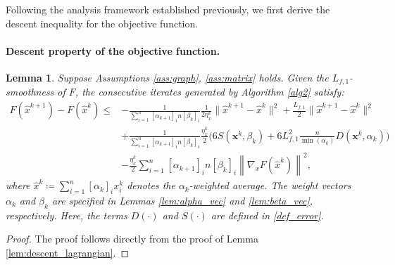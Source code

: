 \documentclass{article}
\theoremstyle{plain}
\newtheorem{lemma}[theorem]{Lemma}
\theoremstyle{definition}
\theoremstyle{remark}
\begin{document}
Following the analysis framework established previously, we first derive the descent inequality for the objective function.

\paragraph{Descent property of the objective function.}
\begin{lemma}\label{lem:descent_objective_single}
    Suppose Assumptions \ref{ass:graph}, \ref{ass:matrix} holds. Given the $L_{f,1}$-smoothness of $F$, the consecutive iterates generated by Algorithm \ref{alg2} satisfy:
    \begin{align*}
        F(\hat{x}^{k+1}) - F(\hat{x}^{k}) 
        \leq {}& -\frac{1}{\sum_{i=1}^{n}[\alpha_{k+1}]_{i} n[\beta_{k}]_{i}} \frac{1}{2\eta_x^{k}} \|\hat{x}^{k+1}-\hat{x}^{k}\|^{2} + \frac{L_{f,1}}{2} \|\hat{x}^{k+1}-\hat{x}^{k}\|^{2} \\
        &+ \frac{1}{\sum_{i=1}^{n}[\alpha_{k+1}]_{i} n[\beta_{k}]_{i}} \frac{\eta_x^{k}}{2} \Bigg( 
        6S(\mathbf{x}^{k},\beta_{k}) + 6L_{f,1}^{2} \frac{n}{\min(\alpha_{k})} D(\mathbf{x}^{k},\alpha_{k}) \Bigg) \\
        &- \frac{\eta_x^{k}}{2}\sum_{i=1}^{n}[\alpha_{k+1}]_{i} n[\beta_{k}]_{i} \left\|  \nabla_{x}F(\hat{x}^{k}) \right\|^{2},
    \end{align*}
where $\hat{x}^{k} \coloneqq \sum_{i=1}^{n}[\alpha_{k}]_{i}x_{i}^{k}$ denotes the $\alpha_k$-weighted average. The weight vectors $\alpha_{k}$ and $\beta_{k}$ are specified in Lemmas \ref{lem:alpha_vec} and \ref{lem:beta_vec}, respectively. Here, the terms $D(\cdot)$ and $S(\cdot)$ are defined in \eqref{def_error}.
\end{lemma}

\begin{proof}
    The proof follows directly from the proof of Lemma \ref{lem:descent_lagrangian}.
\end{proof}
\end{document}
